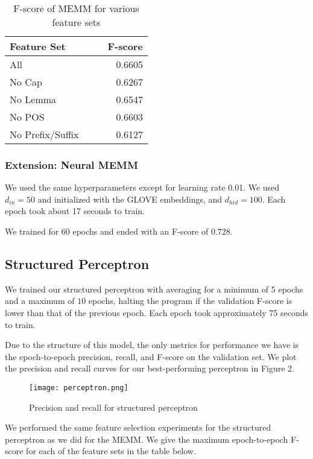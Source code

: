 \documentclass[11pt]{article}
\begin{document}
\begin{table}[h]
  \centering
  \begin{tabular}{lccr}
    \toprule
    Feature Set & & & F-score \\
    \midrule
    All & & & 0.6605 \\
    No Cap & & & 0.6267 \\
    No Lemma & & & 0.6547 \\
    No POS & & & 0.6603 \\
    No Prefix/Suffix & & & 0.6127
  \end{tabular}
  \caption{F-score of MEMM for various feature sets}
  \label{tab:memm}
\end{table}

\subsubsection{Extension: Neural MEMM}

We used the same hyperparameters except for learning rate 0.01. We used $d_{in} = 50$ and initialized with the GLOVE embeddings, and $d_{hid} = 100$. Each epoch took about 17 seconds to train.

We trained for 60 epochs and ended with an F-score of 0.728.

\subsection{Structured Perceptron}

We trained our structured perceptron with averaging for a minimum of $5$ epochs and a maximum of $10$ epochs, halting the program if the validation F-score is lower than that of the previous epoch. Each epoch took approximately 75 seconds to train. 

Due to the structure of this model, the only metrics for performance we have is the epoch-to-epoch precision, recall, and F-score on the validation set. We plot the precision and recall curves for our best-performing perceptron in Figure 2. 

\begin{figure}[h]
\centering
\texttt{[image: perceptron.png]}
\caption{Precision and recall for structured perceptron}
\end{figure}

We performed the same feature selection experiments for the structured perceptron as we did for the MEMM. We give the maximum epoch-to-epoch F-score for each of the feature sets in the table below. 
\end{document}
